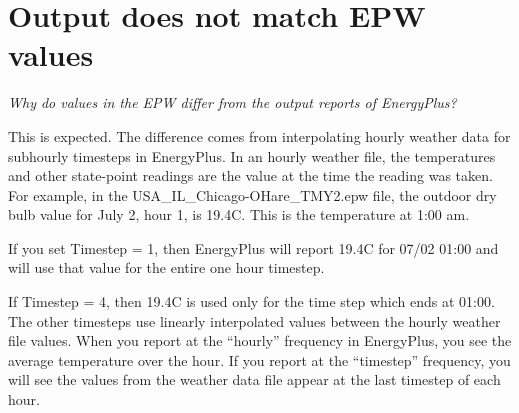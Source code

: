\section{Output does not match EPW values}\label{output-does-not-match-epw-values}

\emph{Why do values in the EPW differ from the output reports of EnergyPlus?}

This is expected. The difference comes from interpolating hourly weather data for subhourly timesteps in EnergyPlus. In an hourly weather file, the temperatures and other state-point readings are the value at the time the reading was taken. For example, in the USA\_IL\_Chicago-OHare\_TMY2.epw file, the outdoor dry bulb value for July 2, hour 1, is 19.4C. This is the temperature at 1:00 am.

If you set Timestep = 1, then EnergyPlus will report 19.4C for 07/02 01:00 and will use that value for the entire one hour timestep.

If Timestep = 4, then 19.4C is used only for the time step which ends at 01:00. The other timesteps use linearly interpolated values between the hourly weather file values. When you report at the ``hourly'' frequency in EnergyPlus, you see the average temperature over the hour. If you report at the ``timestep'' frequency, you will see the values from the weather data file appear at the last timestep of each hour.
